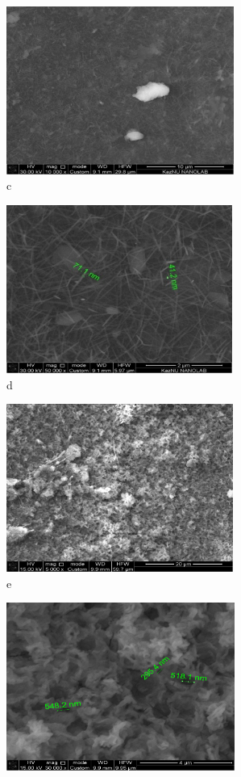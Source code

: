 \begin{figure}[H]
    \begin{subfigure}[t]{0.45\textwidth}
        \centering
        \includegraphics[height=5.5cm]{media/chem2/image95}
        \caption*{c}
    \end{subfigure}
    \begin{subfigure}[t]{0.45\textwidth}
        \centering
        \includegraphics[height=5.5cm]{media/chem2/image96}
        \caption*{d}
    \end{subfigure}
    \begin{subfigure}[t]{0.45\textwidth}
        \centering
        \includegraphics[height=5.5cm]{media/chem2/image97}
        \caption*{e}
    \end{subfigure}
    \begin{subfigure}[t]{0.45\textwidth}
        \centering
        \includegraphics[height=5.5cm]{media/chem2/image98}

\end{subfigure}
\end{figure}
